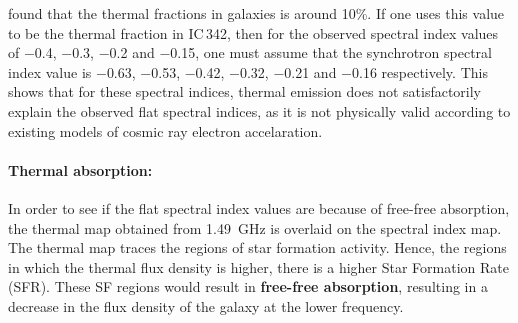 \documentclass[../main/thesis_msc.tex]{subfiles}
\begin{document}
\citet{2017ApJ...836..185T} found that the thermal fractions in galaxies is around 10\%. If one uses this value to be the thermal fraction in IC\,342, then for the observed spectral index values of $-$0.4, $-$0.3, $-$0.2 and $-$0.15, one must assume that the synchrotron spectral index value is $-$0.63, $-$0.53, $-$0.42, $-$0.32, $-$0.21 and $-$0.16 respectively. This shows that for these spectral indices, thermal emission does not satisfactorily explain the observed flat spectral indices, as it is not physically valid according to existing models of cosmic ray electron accelaration. \\

\paragraph{Thermal absorption:} In order to see if the flat spectral index values are because of free-free absorption, the thermal map obtained from 1.49~GHz is overlaid on the spectral index map. The thermal map traces the regions of star formation activity. Hence, the regions in which the thermal flux density is higher, there is a higher Star Formation Rate (SFR). These SF regions would result in \textbf{free-free absorption}, resulting in a decrease in the flux density of the galaxy at the lower frequency.  \\
\end{document}
